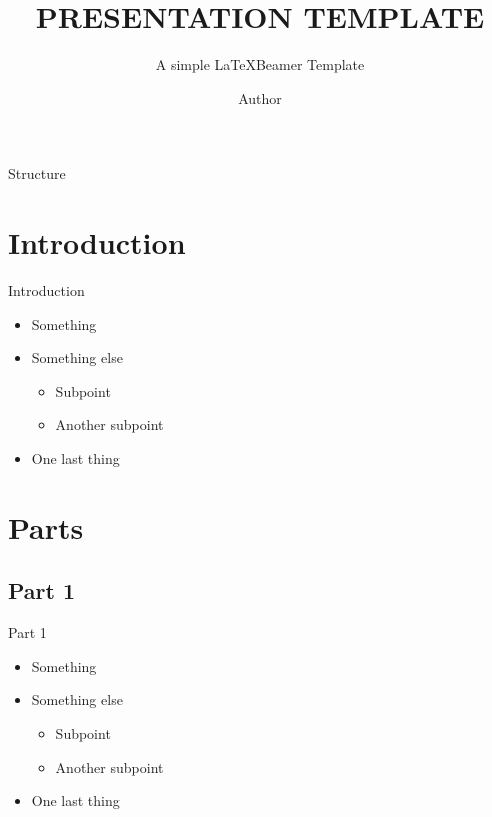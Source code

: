 \documentclass[aspectratio=169,t]{beamer}
\title{PRESENTATION TEMPLATE}
\subtitle{A simple \LaTeX Beamer Template}
\author{Author}
\institute{Institution}
\date{}
\begin{document}
\begin{frame}
	\titlepage
\end{frame}

\begin{frame}{Structure}
	\begin{Large}
		\tableofcontents[pausesections]
	\end{Large}
\end{frame}

\section{Introduction}
\begin{frame}{Introduction}
	\begin{itemize}[<+->]
		\pause
		\item Something
		\item Something else
		      \begin{itemize}
			      \item Subpoint
			      \item Another subpoint
		      \end{itemize}
		\item One last thing
	\end{itemize}
\end{frame}

\section{Parts}
\subsection{Part 1}
\begin{frame}{Part 1}
	\begin{itemize}[<+->]
		\pause
		\item Something
		\item Something else
		      \begin{itemize}
			      \item Subpoint
			      \item Another subpoint
		      \end{itemize}
		\item One last thing
	\end{itemize}
\end{frame}
\end{document}
